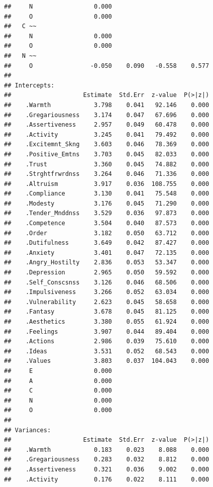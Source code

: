 \documentclass{article}\usepackage[]{graphicx}\usepackage[]{color}
\makeatletter
\newenvironment{kframe}{%
 \def\at@end@of@kframe{}%
 \ifinner\ifhmode%
  \def\at@end@of@kframe{\end{minipage}}%
  \begin{minipage}{\columnwidth}%
 \fi\fi%
 \def\FrameCommand##1{\hskip\@totalleftmargin \hskip-\fboxsep
 \colorbox{shadecolor}{##1}\hskip-\fboxsep
     \hskip-\linewidth \hskip-\@totalleftmargin \hskip\columnwidth}%
 \MakeFramed {\advance\hsize-\width
   \@totalleftmargin\z@ \linewidth\hsize
   \@setminipage}}%
 {\par\unskip\endMakeFramed%
 \at@end@of@kframe}
\newenvironment{knitrout}{}{} %
\makeatother
\begin{document}
\begin{knitrout}
\begin{kframe}
\begin{verbatim}
##     N                 0.000                           
##     O                 0.000                           
##   C ~~                                                
##     N                 0.000                           
##     O                 0.000                           
##   N ~~                                                
##     O                -0.050    0.090   -0.558    0.577
## 
## Intercepts:
##                    Estimate  Std.Err  z-value  P(>|z|)
##    .Warmth            3.798    0.041   92.146    0.000
##    .Gregariousness    3.174    0.047   67.696    0.000
##    .Assertiveness     2.957    0.049   60.478    0.000
##    .Activity          3.245    0.041   79.492    0.000
##    .Excitemnt_Skng    3.603    0.046   78.369    0.000
##    .Positive_Emtns    3.703    0.045   82.033    0.000
##    .Trust             3.360    0.045   74.882    0.000
##    .Strghtfrwrdnss    3.264    0.046   71.336    0.000
##    .Altruism          3.917    0.036  108.755    0.000
##    .Compliance        3.130    0.041   75.548    0.000
##    .Modesty           3.176    0.045   71.290    0.000
##    .Tender_Mnddnss    3.529    0.036   97.873    0.000
##    .Competence        3.504    0.040   87.573    0.000
##    .Order             3.182    0.050   63.712    0.000
##    .Dutifulness       3.649    0.042   87.427    0.000
##    .Anxiety           3.401    0.047   72.135    0.000
##    .Angry_Hostilty    2.836    0.053   53.347    0.000
##    .Depression        2.965    0.050   59.592    0.000
##    .Self_Conscsnss    3.126    0.046   68.506    0.000
##    .Impulsiveness     3.266    0.052   63.034    0.000
##    .Vulnerability     2.623    0.045   58.658    0.000
##    .Fantasy           3.678    0.045   81.125    0.000
##    .Aesthetics        3.380    0.055   61.924    0.000
##    .Feelings          3.907    0.044   89.404    0.000
##    .Actions           2.986    0.039   75.610    0.000
##    .Ideas             3.531    0.052   68.543    0.000
##    .Values            3.803    0.037  104.043    0.000
##     E                 0.000                           
##     A                 0.000                           
##     C                 0.000                           
##     N                 0.000                           
##     O                 0.000                           
## 
## Variances:
##                    Estimate  Std.Err  z-value  P(>|z|)
##    .Warmth            0.183    0.023    8.088    0.000
##    .Gregariousness    0.283    0.032    8.812    0.000
##    .Assertiveness     0.321    0.036    9.002    0.000
##    .Activity          0.176    0.022    8.111    0.000

\end{verbatim}
\end{kframe}
\end{knitrout}
\end{document}
